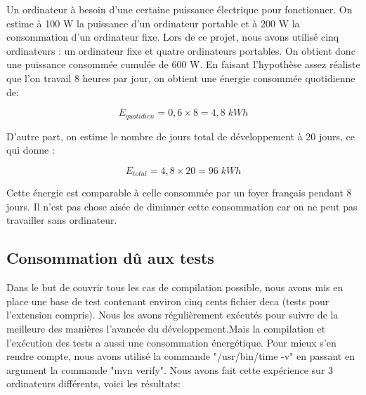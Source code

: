 \documentclass[12pt, a4paper, one side]{article}
\begin{document}
Un ordinateur à besoin d'une certaine puissance électrique pour fonctionner. On estime à 100 W la puissance d'un ordinateur portable et à 200 W la consommation d'un ordinateur fixe. Lors de ce projet, nous avons utilisé cinq ordinateurs : un ordinateur fixe et quatre ordinateurs portables. On obtient donc une puissance consommée cumulée de 600 W. En faisant l'hypothèse assez réaliste que l'on travail 8 heures par jour, on obtient une énergie consommée quotidienne de:

\begin{equation}
E_{quotidien}=0,6\times 8 = 4,8\; kWh
\end{equation}

D'autre part, on estime le nombre de jours total de développement à 20 jours, ce qui donne :

\begin{equation}
E_{total}=4,8\times 20 = 96\; kWh
\end{equation}


Cette énergie est comparable à celle consommée par un foyer français pendant 8 jours. Il n'est pas chose aisée de diminuer cette consommation car on ne peut pas travailler sans ordinateur.

\subsection{Consommation dû aux tests}

Dans le but de couvrir tous les cas de compilation possible, nous avons mis en place une base de test contenant environ cinq cents fichier deca (tests pour l’extension compris). Nous les avons régulièrement exécutés pour suivre de la meilleure des manières l'avancée du développement.Mais la compilation et l'exécution des tests a aussi une consommation énergétique. Pour mieux s'en rendre compte, nous avons utilisé la commande "/usr/bin/time -v" en passant en argument la commande "mvn verify". Nous avons fait cette expérience sur 3 ordinateurs différents, voici les résultats:
\end{document}
